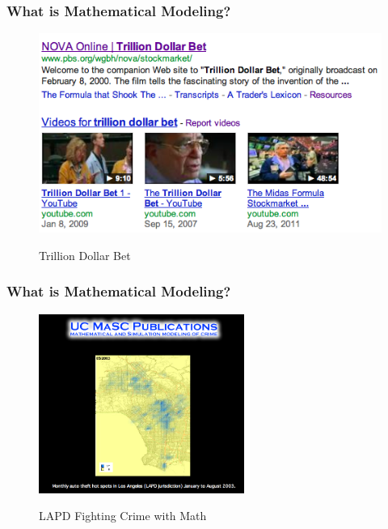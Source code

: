 \documentclass[hyperref={colorlinks=false},compress,handout,10pt]{beamer}
\begin{document}
\begin{frame}
    \frametitle{What is Mathematical Modeling?}
    \begin{figure}
        \centering
        \href{http://www.youtube.com/watch?v=dsrOXJwGwtk}{
        \includegraphics[width=\textwidth]{TrillionDollarBet.png}
        }
        \caption{Trillion Dollar Bet}
                \label{fig:LTCM}
    \end{figure}
\end{frame}

\begin{frame}
    \frametitle{What is Mathematical Modeling?}
    \begin{figure}
        \centering
        \href{http://www.youtube.com/watch?v=HZ7fLuO7zb4}{\includegraphics[width=0.6\textwidth]{LAPDUCLA.png}}
        \caption{
        {LAPD Fighting Crime with Math}} \label{fig:LAPDUCLA}
    \end{figure}
\end{frame}
\end{document}
